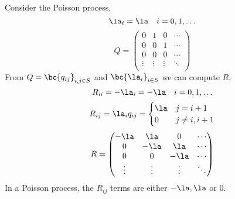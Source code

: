\documentclass{article}
\begin{document}
    \begin{example}
        Consider the Poisson process,
        \[ \la_i = \la \quad i = 0, 1, \ldots \]
        \[ Q = \begin{pmatrix}
            0 & 1 & 0 & \cdots \\
            0 & 0 & 1 & \cdots \\
            0 & 0 & 0 & \cdots \\
            \vdots & \vdots & \vdots & \ddots \\
        \end{pmatrix} \]
        From $Q = \bc{q_{ij}}_{i,j \in S}$ and $\bc{\la_i}_{i \in S}$ we can compute $R$:
        \[ R_{ii} = - \la_i = - \la \quad i = 0, 1, \ldots\]
        \[ R_{ij} = \la_i q_{ij} = \begin{cases}
            \la & j = i+1 \\
            0 & j \neq i, i+1 \\
        \end{cases} \]
        \[ R = \begin{pmatrix}
            -\la & \la & 0 & \cdots \\
            0 & -\la & \la & \cdots \\
            0 & 0 & -\la & \cdots \\
            \vdots & \vdots & \vdots & \ddots \\
        \end{pmatrix} \]
        In a Poisson process, the $R_{ij}$ terms are either $-\la, \la$ or $0$.
    \end{example}
\end{document}
